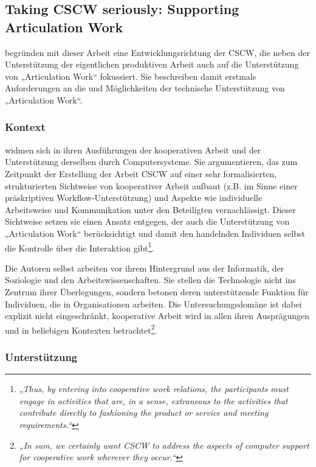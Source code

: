 
\subsection{Taking CSCW seriously: Supporting Articulation Work}

\citet{Schmidt92} begründen mit dieser Arbeit eine Entwicklungsrichtung der \gls{CSCW}, die neben der Unterstützung der eigentlichen produktiven Arbeit auch auf die Unterstützung von „Articulation Work“ fokussiert. Sie beschreiben damit erstmals Anforderungen an die und Möglichkeiten der technische Unterstützung von „Articulation Work“.

\subsubsection{Kontext}

\citet{Schmidt92} widmen sich in ihren Ausführungen der kooperativen Arbeit und der Unterstützung derselben durch Computersysteme. Sie argumentieren, das zum Zeitpunkt der Erstellung der Arbeit \gls{CSCW} auf einer sehr formalisierten, strukturierten Sichtweise von kooperativer Arbeit aufbaut (z.B. im Sinne einer präskriptiven Workflow-Unterstützung) und Aspekte wie individuelle Arbeitsweise und Kommunikation unter den Beteiligten vernachlässigt. Dieser Sichtweise setzen sie einen Ansatz entgegen, der auch die Unterstützung von „Articulation Work“ berücksichtigt und damit den handelnden Individuen selbst die Kontrolle über die Interaktion gibt\footnote{\emph{„Thus, by entering into cooperative work relations, the participants must engage in activities that are, in a sense, extraneous to the activities that contribute directly to fashioning the product or service and meeting requirements.“}\citep[][S. 8]{Schmidt92}}.

Die Autoren selbst arbeiten vor ihrem Hintergrund aus der Informatik, der Soziologie und den Arbeitswissenschaften. Sie stellen die Technologie nicht ins Zentrum ihrer Überlegungen, sondern betonen deren unterstützende Funktion für  Individuen, die in Organisationen arbeiten. Die Untersuchungsdomäne ist dabei explizit nicht eingeschränkt, kooperative Arbeit wird in allen ihren Ausprägungen und in beliebigen Kontexten betrachtet\footnote{\emph{„In sum, we certainly want CSCW to address the aspects of computer support for cooperative work wherever they occur.“}\citep[][S. 11]{Schmidt92}}.

\subsubsection{Unterstützung}

